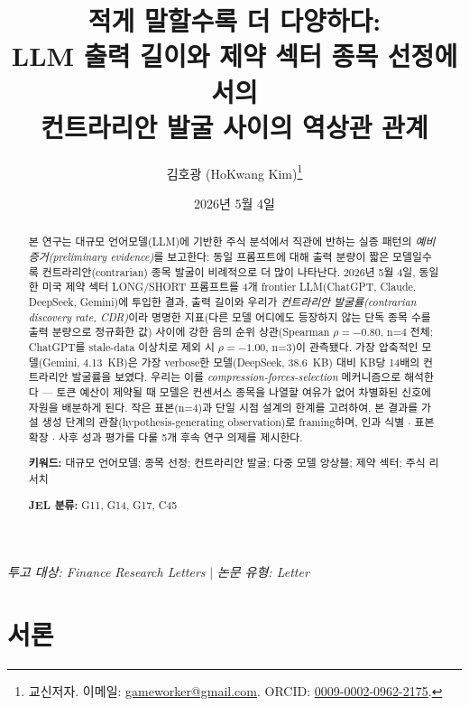 \documentclass[11pt,letterpaper]{article}
\title{\textbf{적게 말할수록 더 다양하다:\\[2pt]
\large LLM 출력 길이와 제약 섹터 종목 선정에서의 \\
컨트라리안 발굴 사이의 역상관 관계}}
\author[1]{김호광 (HoKwang Kim)\thanks{교신저자. 이메일: \href{mailto:gameworker@gmail.com}{gameworker@gmail.com}. ORCID: \href{https://orcid.org/0009-0002-0962-2175}{0009-0002-0962-2175}.}}
\affil[1]{베타랩스 주식회사 (Betalabs Inc.), 대한민국 서울}
\date{2026년 5월 4일}
\begin{document}
\maketitle

\thispagestyle{empty}

\vspace{1em}
\begin{center}
\textit{투고 대상: Finance Research Letters} \quad $|$ \quad \textit{논문 유형: Letter}
\end{center}

\begin{abstract}
\noindent
본 연구는 대규모 언어모델(LLM)에 기반한 주식 분석에서 직관에 반하는 실증 패턴의 \textit{예비 증거(preliminary evidence)}를 보고한다: 동일 프롬프트에 대해 출력 분량이 짧은 모델일수록 컨트라리안(contrarian) 종목 발굴이 비례적으로 더 많이 나타난다. 2026년 5월 4일, 동일한 미국 제약 섹터 LONG/SHORT 프롬프트를 4개 frontier LLM(ChatGPT, Claude, DeepSeek, Gemini)에 투입한 결과, 출력 길이와 우리가 \textit{컨트라리안 발굴률(contrarian discovery rate, CDR)}이라 명명한 지표(다른 모델 어디에도 등장하지 않는 단독 종목 수를 출력 분량으로 정규화한 값) 사이에 강한 음의 순위 상관(Spearman $\rho=-0.80$, n=4 전체; ChatGPT를 stale-data 이상치로 제외 시 $\rho=-1.00$, n=3)이 관측됐다. 가장 압축적인 모델(Gemini, 4.13~KB)은 가장 verbose한 모델(DeepSeek, 38.6~KB) 대비 KB당 14배의 컨트라리안 발굴률을 보였다. 우리는 이를 \textit{compression-forces-selection} 메커니즘으로 해석한다 --- 토큰 예산이 제약될 때 모델은 컨센서스 종목을 나열할 여유가 없어 차별화된 신호에 자원을 배분하게 된다. 작은 표본(n=4)과 단일 시점 설계의 한계를 고려하여, 본 결과를 가설 생성 단계의 관찰(hypothesis-generating observation)로 framing하며, 인과 식별 $\cdot$ 표본 확장 $\cdot$ 사후 성과 평가를 다룰 5개 후속 연구 의제를 제시한다.

\vspace{0.5em}
\noindent\textbf{키워드:} 대규모 언어모델; 종목 선정; 컨트라리안 발굴; 다중 모델 앙상블; 제약 섹터; 주식 리서치

\noindent\textbf{JEL 분류:} G11, G14, G17, C45
\end{abstract}

\section{서론}
\end{document}
